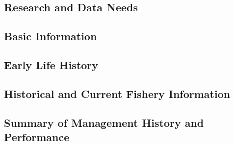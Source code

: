 \documentclass[11pt,
  english,
  a4paper,
]{article}
\begin{document}
\leavevmode\tagmcend\tagstructend


\hypertarget{research-and-data-needs-2}{%
\subsection*{Research and Data Needs}\label{research-and-data-needs-2}}

\leavevmode\tagmcend\tagstructend


\hypertarget{basic-information-1}{%
\subsection{Basic Information}\label{basic-information-1}}

\leavevmode\tagmcend\tagstructend


\hypertarget{early-life-history-1}{%
\subsection{Early Life History}\label{early-life-history-1}}

\leavevmode\tagmcend\tagstructend


\hypertarget{historical-and-current-fishery-information-1}{%
\subsection{Historical and Current Fishery Information}\label{historical-and-current-fishery-information-1}}

\leavevmode\tagmcend\tagstructend


\hypertarget{summary-of-management-history-and-performance-1}{%
\subsection{Summary of Management History and Performance}\label{summary-of-management-history-and-performance-1}}

\leavevmode\tagmcend\tagstructend

\end{document}

